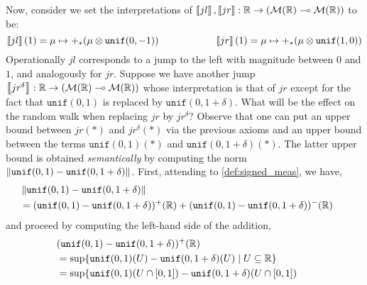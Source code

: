 \begin{example}
Now, consider we set the interpretations of $\left \llbracket jl \right \rrbracket, \left \llbracket jr \right \rrbracket: \mathbb{R} \to ( \mathcal{M}(\mathbb{R}) \multimap  \mathcal{M}(\mathbb{R}))$ to be:
\[
                        \left \llbracket jl \right \rrbracket(1)= \mu \mapsto +_\ast(\mu \otimes \mathtt{unif}(0,-1))
                        \hspace{2cm}
                        \left \llbracket jr \right \rrbracket(1) =\mu \mapsto +_\ast(\mu \otimes \mathtt{unif}(1,0))
        \]
Operationally $jl$ corresponds to a jump to the left with magnitude between $0$ and $1$, and analogously for $jr$.
Suppose we have another jump $\left \llbracket jr^{\delta} \right \rrbracket : \mathbb{R} \to ( \mathcal{M}(\mathbb{R}) \multimap  \mathcal{M}(\mathbb{R}))$ whose interpretation is that of $jr$ except for the 
fact that $\mathtt{unif}(0,1)$ is replaced by $\mathtt{unif}(0,1+\delta)$.
What will be the effect on the random walk when replacing $jr$ by $jr^{\delta}$?
Observe that one can put an upper bound between $jr(\ast)$ and $jr^{\delta}(\ast)$ via the previous axioms and an upper bound between the terms $\mathtt{unif}(0,1)(\ast)$ and $\mathtt{unif}(0,1+\delta)(\ast)$. The latter upper bound is obtained \emph{semantically} by computing the norm $\left\lVert \mathtt{unif}(0,1) - \mathtt{unif}(0,1+\delta)  \right\rVert$.  First, attending to \autoref{def:signed_meas}, we have,
        \begin{align*}
        &\hspace{-15pt} \norm{ \mathtt{unif}(0,1) - \mathtt{unif}(0,1+\delta) }
        \\
        & \hspace{-15pt} =
        (\mathtt{unif}(0,1) - \mathtt{unif}(0,1+\delta))^+ (\Reals)
        +
        (\mathtt{unif}(0,1) - \mathtt{unif}(0,1+\delta))^- (\Reals)
        \end{align*}
        and proceed by computing the left-hand side of the addition,
        \begin{align*} 
        & \hspace{-15pt}(\mathtt{unif}(0,1) - \mathtt{unif}(0,1+\delta))^+ (\Reals)
        \\
        & \hspace{-15pt} = 
        \sup \{ \mathtt{unif}(0,1)(U) - \mathtt{unif}(0,1 + \delta)(U)
        \mid U \subseteq \Reals \}
        \\
        & \hspace{-15pt}
        =
        \sup \{ \mathtt{unif}(0,1)(U \cap [0,1]) 
        - \mathtt{unif}(0,1 + \delta)(U \cap [0,1]) \\
        & \hspace{-15pt} \hspace{10pt}

\end{align*}
\end{example}

